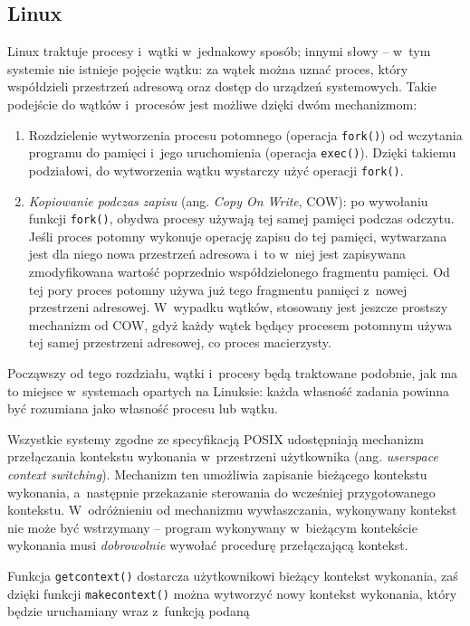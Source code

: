 \documentclass[12pt]{mwart}
\newcommand{\code}{\texttt}
\newcommand{\procbr}{()}
\newcommand{\function}[1]{\code{#1\procbr}}
\begin{document}
\subsection{Linux}
\indent
  Linux traktuje procesy i~wątki w~jednakowy sposób; innymi słowy -- w~tym systemie nie istnieje pojęcie wątku: za wątek można uznać proces, który
  współdzieli przestrzeń adresową oraz dostęp do urządzeń systemowych.
  Takie podejście do wątków i~procesów jest możliwe dzięki dwóm mechanizmom:
  \begin{enumerate}
    \item Rozdzielenie wytworzenia procesu potomnego (operacja \function{fork}) od wczytania programu do pamięci i~jego uruchomienia (operacja \function{exec}).
    Dzięki takiemu podziałowi, do wytworzenia wątku wystarczy użyć operacji \function{fork}.
    \item \emph{Kopiowanie podczas zapisu} (ang. \emph{Copy On Write}, COW): po wywołaniu funkcji \function{fork}, obydwa procesy używają
    tej samej pamięci podczas odczytu. Jeśli proces potomny wykonuje operację zapisu do tej pamięci, wytwarzana jest dla niego nowa przestrzeń adresowa
    i~to w~niej jest zapisywana zmodyfikowana wartość poprzednio współdzielonego fragmentu pamięci. Od tej pory proces potomny używa już tego fragmentu pamięci 
    z~nowej przestrzeni adresowej. W~wypadku wątków, stosowany jest jeszcze prostszy mechanizm od COW, gdyż każdy wątek będący procesem potomnym używa tej samej
    przestrzeni adresowej, co proces macierzysty.
  \end{enumerate}
  Począwszy od tego rozdziału, wątki i~procesy będą traktowane podobnie, jak ma to miejsce w~systemach opartych na Linuksie: każda własność zadania powinna być
  rozumiana jako własność procesu lub wątku.
\par
%
\indent
  Wszystkie systemy zgodne ze specyfikacją POSIX \cite{POSIX} udostępniają mechanizm przełączania kontekstu wykonania w~przestrzeni użytkownika (ang. \emph{user\dywiz space context switching}).
  Mechanizm ten umożliwia zapisanie bieżącego kontekstu wykonania, a~następnie przekazanie sterowania do wcześniej przygotowanego kontekstu. W~odróżnieniu od mechanizmu wywłaszczania,
  wykonywany kontekst nie może być wstrzymany -- program wykonywany w~bieżącym kontekście wykonania musi \emph{dobrowolnie} wywołać procedurę przełączającą kontekst.
\par
%
\indent
  Funkcja \function{getcontext} \cite{setcontext} dostarcza użytkownikowi bieżący kontekst wykonania, zaś dzięki funkcji \function{makecontext} \cite{swapcontext} można wytworzyć nowy kontekst wykonania, który będzie uruchamiany wraz z~funkcją podaną
\end{document}
